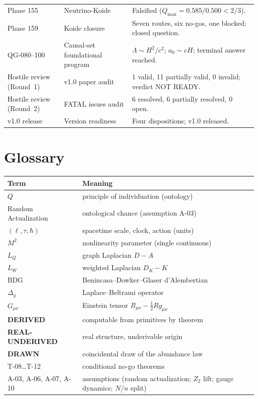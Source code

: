 \documentclass[10pt,twoside,openany]{book}
\newcommand{\derived}{\textbf{DERIVED}}
\newcommand{\realunder}{\textbf{REAL-UNDERIVED}}
\newcommand{\drawn}{\textbf{DRAWN}}
\begin{document}
\begin{longtable}{p{4.2cm}p{5.2cm}p{5.6cm}}
Phase 155 & Neutrino-Koide & Falsified ($Q_{\max}=0.585/0.500<2/3$). \\
Phase 159 & Koide closure & Seven routes, six no-gos, one blocked; closed question. \\
QG-080--100 & Causal-set foundational program & $\Lambda\sim H^2/c^2$; $a_0\sim cH$; terminal answer reached. \\
Hostile review (Round~1) & v1.0 paper audit & 1 valid, 11 partially valid, 0 invalid; verdict NOT READY. \\
Hostile review (Round~2) & FATAL issues audit & 6 resolved, 6 partially resolved, 0 open. \\
v1.0 release & Version readiness & Four dispositions; v1.0 released. \\
\bottomrule
\end{longtable}

\chapter{Glossary}
\label{app:glossary}

\begin{center}
\begin{tabular}{lp{10cm}}
\toprule
Term & Meaning \\
\midrule
$Q$ & principle of individuation (ontology) \\
Random Actualization & ontological chance (assumption A-03) \\
$(\ell,\tau,\hbar)$ & spacetime scale, clock, action (units) \\
$M^2$ & nonlinearity parameter (single continuous) \\
$L_Q$ & graph Laplacian $D-A$ \\
$L_W$ & weighted Laplacian $D_K-K$ \\
BDG & Benincasa--Dowker--Glaser d'Alembertian \\
$\Delta_g$ & Laplace--Beltrami operator \\
$G_{\mu\nu}$ & Einstein tensor $R_{\mu\nu}-\tfrac12 R g_{\mu\nu}$ \\
\derived & computable from primitives by theorem \\
\realunder & real structure, underivable origin \\
\drawn & coincidental draw of the abundance law \\
T-08\dots T-12 & conditional no-go theorems \\
A-03, A-06, A-07, A-10 & assumptions (random actualization; $Z_2$ lift; gauge dynamics; $N$/$n$ split) \\
\bottomrule
\end{tabular}
\end{center}
\end{document}
